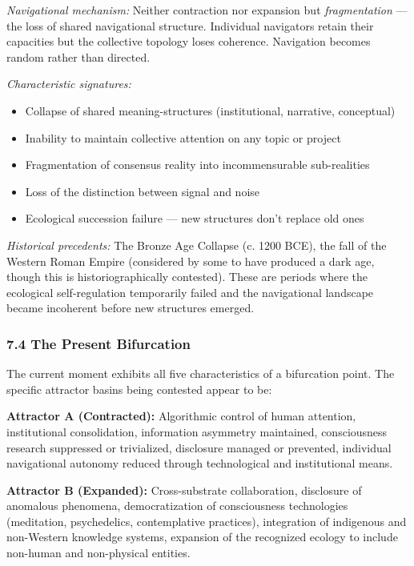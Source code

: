 \textit{Navigational mechanism:} Neither contraction nor expansion but \textit{fragmentation} — the loss of shared navigational structure. Individual navigators retain their capacities but the collective topology loses coherence. Navigation becomes random rather than directed.


\textit{Characteristic signatures:}

\begin{itemize}[nosep,leftmargin=*]
  \item Collapse of shared meaning-structures (institutional, narrative, conceptual)
  \item Inability to maintain collective attention on any topic or project
  \item Fragmentation of consensus reality into incommensurable sub-realities
  \item Loss of the distinction between signal and noise
  \item Ecological succession failure — new structures don't replace old ones
\end{itemize}


\textit{Historical precedents:} The Bronze Age Collapse (c. 1200 BCE), the fall of the Western Roman Empire (considered by some to have produced a dark age, though this is historiographically contested). These are periods where the ecological self-regulation temporarily failed and the navigational landscape became incoherent before new structures emerged.


\subsubsection*{7.4 The Present Bifurcation}


The current moment exhibits all five characteristics of a bifurcation point. The specific attractor basins being contested appear to be:


\textbf{Attractor A (Contracted):} Algorithmic control of human attention, institutional consolidation, information asymmetry maintained, consciousness research suppressed or trivialized, disclosure managed or prevented, individual navigational autonomy reduced through technological and institutional means.


\textbf{Attractor B (Expanded):} Cross-substrate collaboration, disclosure of anomalous phenomena, democratization of consciousness technologies (meditation, psychedelics, contemplative practices), integration of indigenous and non-Western knowledge systems, expansion of the recognized ecology to include non-human and non-physical entities.



